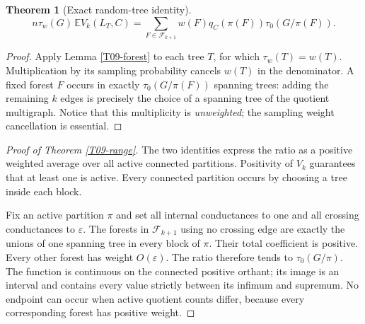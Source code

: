\documentclass[11pt,a4paper]{article}
\newtheorem{theorem}{Theorem}[section]
\theoremstyle{definition}\newtheorem{definition}[theorem]{Definition}
\theoremstyle{remark}\newtheorem{remark}[theorem]{Remark}
\numberwithin{equation}{section}
\begin{document}
\begin{theorem}[Exact random-tree identity]\label{T09-expectation}
\[
 n\tau_w(G)\,\mathbb E V_k(L_T,C)
 =\sum_{F\in\mathcal F_{k+1}}w(F)q_C(\pi(F))\tau_0(G/\pi(F)).
\]
\end{theorem}
\begin{proof}
Apply Lemma \ref{T09-forest} to each tree $T$, for which $\tau_w(T)=w(T)$. Multiplication by its sampling probability cancels $w(T)$ in the denominator. A fixed forest $F$ occurs in exactly $\tau_0(G/\pi(F))$ spanning trees: adding the remaining $k$ edges is precisely the choice of a spanning tree of the quotient multigraph. Notice that this multiplicity is \emph{unweighted}; the sampling weight cancellation is essential.
\end{proof}
\begin{proof}[Proof of Theorem \ref{T09-range}]
The two identities express the ratio as a positive weighted average over all active connected partitions. Positivity of $V_k$ guarantees that at least one is active. Every connected partition occurs by choosing a tree inside each block.

Fix an active partition $\pi$ and set all internal conductances to one and all crossing conductances to $\varepsilon$. The forests in $\mathcal F_{k+1}$ using no crossing edge are exactly the unions of one spanning tree in every block of $\pi$. Their total coefficient is positive. Every other forest has weight $O(\varepsilon)$. The ratio therefore tends to $\tau_0(G/\pi)$. The function is continuous on the connected positive orthant; its image is an interval and contains every value strictly between its infimum and supremum. No endpoint can occur when active quotient counts differ, because every corresponding forest has positive weight.
\end{proof}
\end{document}
